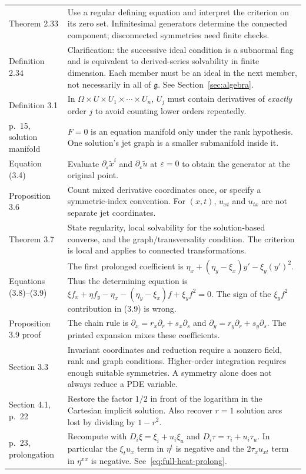 \documentclass[11pt,a4paper]{article}
\numberwithin{equation}{section}
\theoremstyle{definition}
\theoremstyle{plain}
\theoremstyle{remark}
\newcommand{\g}{\mathfrak g}
\begin{document}
\begin{longtable}{@{}>{\raggedright\arraybackslash}p{.21\linewidth}>{\raggedright\arraybackslash}p{.73\linewidth}@{}}
Theorem 2.33 & Use a regular defining equation and interpret the criterion on its zero set. Infinitesimal generators determine the connected component; disconnected symmetries need finite checks.\\
Definition 2.34 & Clarification: the successive ideal condition is a subnormal flag and is equivalent to derived-series solvability in finite dimension. Each member must be an ideal in the next member, not necessarily in all of $\g$. See Section~\ref{sec:algebra}.\\
Definition 3.1 & In $\Omega\times U\times U_1\times\cdots\times U_n$, $U_j$ must contain derivatives of \emph{exactly} order $j$ to avoid counting lower orders repeatedly.\\
p.~15, solution manifold & $F=0$ is an equation manifold only under the rank hypothesis. One solution's jet graph is a smaller submanifold inside it.\\
Equation (3.4) & Evaluate $\partial_\varepsilon\widetilde x^i$ and $\partial_\varepsilon\widetilde u$ at $\varepsilon=0$ to obtain the generator at the original point.\\
Proposition 3.6 & Count mixed derivative coordinates once, or specify a symmetric-index convention. For $(x,t)$, $u_{xt}$ and $u_{tx}$ are not separate jet coordinates.\\
Theorem 3.7 & State regularity, local solvability for the solution-based converse, and the graph/transversality condition. The criterion is local and applies to connected transformations.\\
Equations (3.8)--(3.9) & The first prolonged coefficient is $\eta_x+(\eta_y-\xi_x)y'-\xi_y(y')^2$. Thus the determining equation is $\xi f_x+\eta f_y-\eta_x-(\eta_y-\xi_x)f+\xi_y f^2=0$. The sign of the $\xi_y f^2$ contribution in (3.9) is wrong.\\
Proposition 3.9 proof & The chain rule is $\partial_x=r_x\partial_r+s_x\partial_s$ and $\partial_y=r_y\partial_r+s_y\partial_s$. The printed expansion mixes these coefficients.\\
Section 3.3 & Invariant coordinates and reduction require a nonzero field, rank and graph conditions. Higher-order integration requires enough suitable symmetries. A symmetry alone does not always reduce a PDE variable.\\
Section 4.1, p.~22 & Restore the factor $1/2$ in front of the logarithm in the Cartesian implicit solution. Also recover $r=1$ solution arcs lost by dividing by $1-r^2$.\\
p.~23, prolongation & Recompute with $D_i\xi=\xi_i+u_i\xi_u$ and $D_i\tau=\tau_i+u_i\tau_u$. In particular the $\xi_tu_x$ term in $\eta^t$ is negative and the $2\tau_xu_{xt}$ term in $\eta^{xx}$ is negative. See~\eqref{eq:full-heat-prolong}.\\

\end{longtable}
\end{document}
